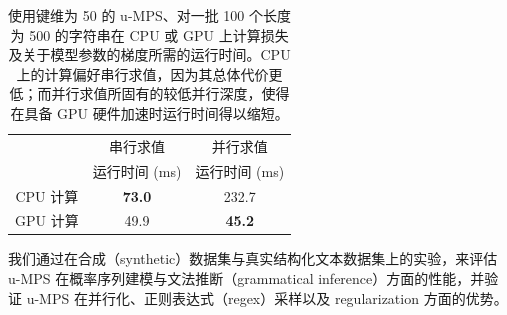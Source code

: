 %
\begin{table}[t]
\caption{使用键维为 50 的 u-MPS、对一批 100 个长度为 500 的字符串在 CPU 或 GPU 上计算损失及关于模型参数的梯度所需的运行时间。CPU 上的计算偏好串行求值，因为其总体代价更低；而并行求值所固有的较低并行深度，使得在具备 GPU 硬件加速时运行时间得以缩短。}
\label{tab:runtime}
\renewcommand{\arraystretch}{1.1}
\begin{center}
\begin{small}
\begin{sc}
\begin{tabular}{c|cc}
          & 串行求值 & 并行求值   \\
          & 运行时间 (ms)     & 运行时间 (ms) \\
\hline
CPU 计算 & \textbf{73.0}    & 232.7 \\
GPU 计算 & 49.9             & \textbf{45.2}  \\
\end{tabular}
\end{sc}
\end{small}
\end{center}
\vskip -0.1in
\end{table}

我们通过在合成（synthetic）数据集与真实结构化文本数据集上的实验，来评估 u-MPS 在概率序列建模与文法推断（grammatical inference）方面的性能，并验证 u-MPS 在并行化、正则表达式（regex）采样以及 regularization 方面的优势。


